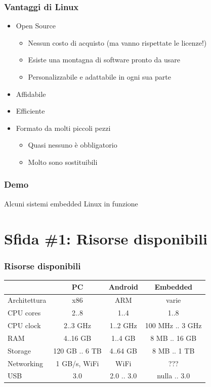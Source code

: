 \documentclass[xetex,table]{beamer}
\begin{document}
\begin{frame}
\frametitle{Vantaggi di Linux}
  \begin{itemize}
    \item Open Source
    \begin{itemize}
      \item Nessun costo di acquisto (ma vanno rispettate le licenze!)
      \item Esiste una montagna di software pronto da usare
      \item Personalizzabile e adattabile in ogni sua parte
    \end{itemize}
    \item Affidabile
    \item Efficiente
    \item Formato da molti piccoli pezzi
    \begin{itemize}
      \item Quasi nessuno è obbligatorio
      \item Molto sono sostituibili
    \end{itemize}
  \end{itemize}
\end{frame}

\begin{frame}
\frametitle[Demo! Alcuni sistemi Linux embedded in funzione]{Demo}
  \begin{center}
    \LARGE
    Alcuni sistemi embedded Linux in funzione
  \end{center}
\end{frame}

\section{Sfida \#1: Risorse disponibili}

\begin{frame}
\frametitle{Risorse disponibili}
{
  \begin{tabular}{ |l|c|c|c|  }
    \hline
     & PC & Android & Embedded \\
    \hline
    Architettura & x86            & ARM        & varie            \\
    CPU cores    & 2..8           & 1..4       & 1..8             \\
    CPU clock    & 2..3 GHz       & 1..2 GHz   & 100 MHz .. 3 GHz \\
    RAM          & 4..16 GB       & 1..4 GB    & 8 MB .. 16 GB    \\
    Storage      & 120 GB .. 6 TB & 4..64 GB   & 8 MB .. 1 TB     \\
    Networking   & 1 GB/s, WiFi   & WiFi       & ???              \\
    USB          & 3.0            & 2.0 .. 3.0 & nulla .. 3.0     \\
    \hline
  \end{tabular}
}
\end{frame}
\end{document}
